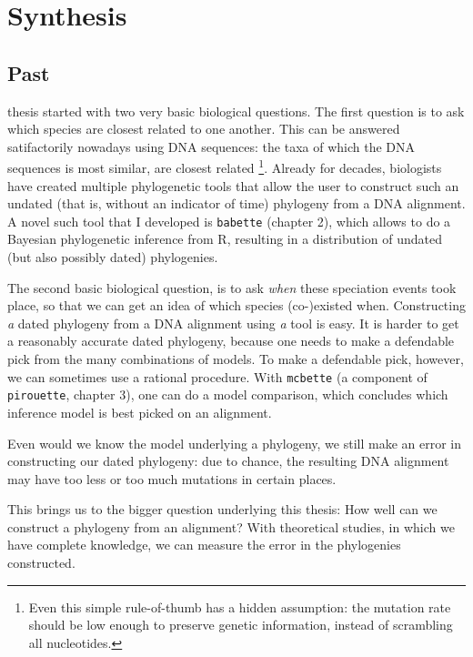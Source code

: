 \chapter{Synthesis}
\label{synthesis}
\newpage

\section{Past}

\noindent

 thesis started with two very basic biological 
questions. The first question is to ask which species are closest related to
one another. This can be answered satifactorily 
nowadays using DNA sequences: the taxa of
which the DNA sequences is most similar, are closest related
\footnote{
  Even this simple rule-of-thumb has a hidden assumption:
  the mutation rate should be low enough to preserve genetic information,
  instead of scrambling all nucleotides.
}.
Already for decades, biologists have created multiple phylogenetic tools 
that allow the user to construct such an 
undated (that is, without an indicator of time) 
phylogeny from a DNA alignment.
A novel such tool that I developed is \verb;babette; (chapter 2), 
which allows to do a Bayesian phylogenetic inference from R,
resulting in a distribution of undated (but also possibly dated) phylogenies.


The second basic biological question, is to 
ask \emph{when} these speciation events took place,
so that we can get an idea of which species (co-)existed when.
Constructing \emph{a} dated phylogeny from a DNA alignment 
using \emph{a} tool is easy.
It is harder to get a reasonably accurate dated phylogeny,
because one needs to make a defendable pick from the many combinations of 
models. To make a defendable pick, however, we can sometimes use
a rational procedure. With \verb;mcbette; (a component of \verb;pirouette;,
chapter 3), one can do a model
comparison, which concludes which inference model is best picked
on an alignment. 

Even would we know the model underlying a phylogeny, we
still make an error in constructing our dated phylogeny: due
to chance, the resulting DNA alignment may have 
too less or too much mutations in certain places.

This brings us to the bigger question underlying this thesis:
How well can we construct a phylogeny from an alignment?
With theoretical studies, in which we have complete knowledge,
we can measure the error in the phylogenies constructed.

